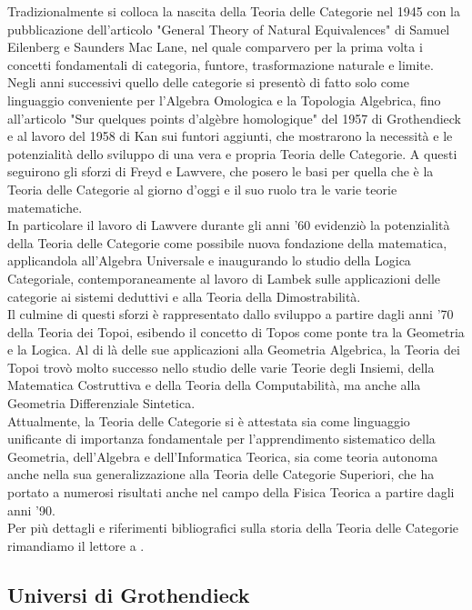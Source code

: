 \documentclass[openany]{book}
\begin{document}
Tradizionalmente si colloca la nascita della Teoria delle Categorie nel 1945 con la pubblicazione dell'articolo "General Theory of Natural Equivalences" di Samuel Eilenberg e Saunders Mac Lane, nel quale comparvero per la prima volta i concetti fondamentali di categoria, funtore, trasformazione naturale e limite.\\
Negli anni successivi quello delle categorie si presentò di fatto solo come linguaggio conveniente per l'Algebra Omologica e la Topologia Algebrica, fino all'articolo "Sur quelques points d'algèbre homologique" del 1957 di Grothendieck e al lavoro del 1958 di Kan sui funtori aggiunti, che mostrarono la necessità e le potenzialità dello sviluppo di una vera e propria Teoria delle Categorie. A questi seguirono gli sforzi di Freyd e Lawvere, che posero le basi per quella che è la Teoria delle Categorie al giorno d'oggi e il suo ruolo tra le varie teorie matematiche.\\
In particolare il lavoro di Lawvere durante gli anni '60 evidenziò la potenzialità della Teoria delle Categorie come possibile nuova fondazione della matematica, applicandola all'Algebra Universale e inaugurando lo studio della Logica Categoriale, contemporaneamente al lavoro di Lambek sulle applicazioni delle categorie ai sistemi deduttivi e alla Teoria della Dimostrabilità.\\
Il culmine di questi sforzi è rappresentato dallo sviluppo a partire dagli anni '70 della Teoria dei Topoi, esibendo il concetto di Topos come ponte tra la Geometria e la Logica. Al di là delle sue applicazioni alla Geometria Algebrica, la Teoria dei Topoi trovò molto successo nello studio delle varie Teorie degli Insiemi, della Matematica Costruttiva e della Teoria della Computabilità, ma anche alla Geometria Differenziale Sintetica.\\
Attualmente, la Teoria delle Categorie si è attestata sia come linguaggio unificante di importanza fondamentale per l'apprendimento sistematico della Geometria, dell'Algebra e dell'Informatica Teorica, sia come teoria autonoma anche nella sua generalizzazione alla Teoria delle Categorie Superiori, che ha portato a numerosi risultati anche nel campo della Fisica Teorica a partire dagli anni '90.\\
Per più dettagli e riferimenti bibliografici sulla storia della Teoria delle Categorie rimandiamo il lettore a \cite{Marquis2026}.

\subsection{Universi di Grothendieck}
\end{document}
